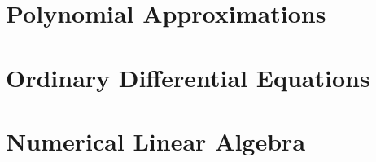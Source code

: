 \documentclass[british,11pt,a4paper]{report}
\begin{document}
\maketitle
\tableofcontents

\chapter{Polynomial Approximations}

\chapter{Ordinary Differential Equations}

\chapter{Numerical Linear Algebra}

\end{document}
